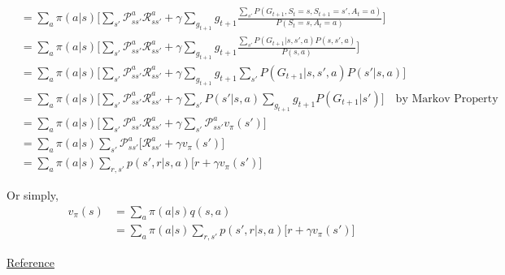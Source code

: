 \begin{appendices}
\begin{align*}
&=\sum_a \pi(a|s)\Bigg[\sum_{s'} \mathcal{P}_{ss'}^a\mathcal{R}_{ss'}^a + \gamma \sum_{g_{t+1}}g_{t+1}\frac{\sum_{s'}P( G_{t+1},S_t = s, S_{t+1}=s', A_{t}=a)}{P(S_t = s, A_{t}=a)}\Bigg]\\
&=\sum_a \pi(a|s)\Bigg[\sum_{s'} \mathcal{P}_{ss'}^a\mathcal{R}_{ss'}^a + \gamma \sum_{g_{t+1}}g_{t+1}\frac{\sum_{s'}P( G_{t+1}|s, s', a)P(s, s', a)}{P(s, a)}\Bigg]\\
&=\sum_a \pi(a|s)\Bigg[\sum_{s'} \mathcal{P}_{ss'}^a\mathcal{R}_{ss'}^a + \gamma \sum_{g_{t+1}}g_{t+1}\sum_{s'}P( G_{t+1}|s, s', a)P(s'| s, a)\Bigg]\\
&=\sum_a \pi(a|s)\Bigg[\sum_{s'} \mathcal{P}_{ss'}^a\mathcal{R}_{ss'}^a + \gamma \sum_{s'}P(s'| s, a)\sum_{g_{t+1}}g_{t+1}P( G_{t+1}|s')\Bigg] \quad \textrm{by Markov Property}\\
&=\sum_a \pi(a|s)\Bigg[\sum_{s'} \mathcal{P}_{ss'}^a\mathcal{R}_{ss'}^a + \gamma \sum_{s'}\mathcal{P}_{ss'}^a v_\pi(s')\Bigg] \\
&=\sum_a \pi(a|s)\sum_{s'}\mathcal{P}_{ss'}^a\Bigg[\mathcal{R}_{ss'}^a + \gamma  v_\pi(s')\Bigg] \\
&=\sum_a \pi(a|s)\sum_{r,s'}p(s',r|s,a)\Big[r + \gamma  v_\pi(s')\Big] 
\end{align*}

Or simply, 
\begin{align*}
	v_\pi(s) &= \sum_a \pi(a|s)q(s,a)\\
	&=\sum_a \pi(a|s)\sum_{r,s'}p(s',r|s,a)\Big[r + \gamma  v_\pi(s')\Big] 
\end{align*}

\href{https://stats.stackexchange.com/questions/243384/deriving-bellmans-equation-in-reinforcement-learning}{Reference}


\end{appendices}
